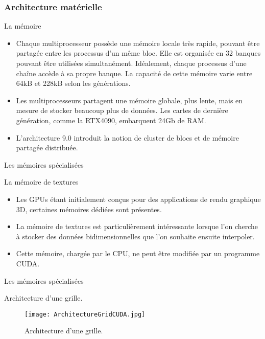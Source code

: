 \begin{frame}
    \frametitle{Architecture matérielle}
\begin{block}{La mémoire}
   \begin{itemize}
    \item<+-> Chaque multiprocesseur possède une mémoire locale très rapide, pouvant être partagée entre les processus
    d'un même bloc. Elle est organisée en 32 banques pouvant être utilisées simultanément. Idéalement, 
    chaque processus d'une chaîne accède à sa propre banque. La capacité de cette mémoire varie entre 64kB et 228kB 
    selon les générations.
    \item<+-> Les multiprocesseurs partagent une mémoire globale, plus lente, mais en mesure de stocker beaucoup plus 
    de données. Les cartes de dernière génération, comme la RTX4090, embarquent 24Gb de RAM.
    \item<+-> L'architecture 9.0 introduit la notion de cluster de blocs et de mémoire partagée distribuée.
   \end{itemize} 
\end{block}
\end{frame}
\begin{frame}{Les mémoires spécialisées}
\begin{block}{La mémoire de textures}
   \begin{itemize}
    \item<+-> Les GPUs étant initialement conçus pour des applications de rendu graphique 3D, certaines mémoires
    dédiées sont présentes. 
    \item<+-> La mémoire de textures est particulièrement intéressante lorsque l'on cherche à stocker des données
    bidimensionnelles que l'on souhaite ensuite interpoler.
    \item<+-> Cette mémoire, chargée par le CPU, ne peut être modifiée par un programme CUDA.
   \end{itemize} 
\end{block}
\end{frame}

\begin{frame}{Les mémoires spécialisées}
\begin{block}{Architecture d'une grille.}
    \begin{figure}[htbp]
        \centering
         \texttt{[image: ArchitectureGridCUDA.jpg]} 
        \caption{Architecture d'une grille.}
        \label{fig:architectureGridCUDA}
    \end{figure}
\end{block}
\end{frame}

